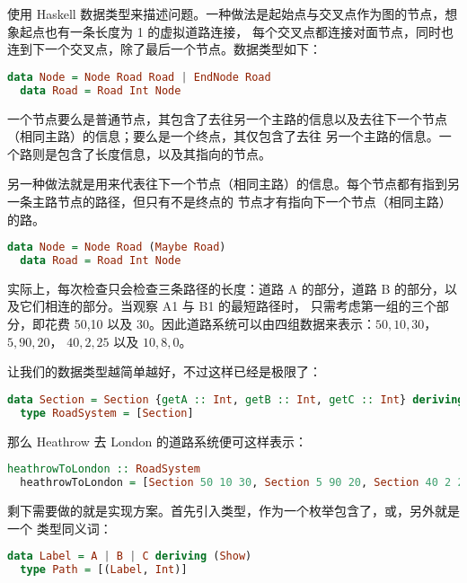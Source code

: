 \documentclass[./main.tex]{subfiles}
\begin{document}
使用 Haskell 数据类型来描述问题。一种做法是起始点与交叉点作为图的节点，想象起点也有一条长度为 1 的虚拟道路连接，
每个交叉点都连接对面节点，同时也连到下一个交叉点，除了最后一个节点。数据类型如下：

\begin{lstlisting}[language=Haskell]
  data Node = Node Road Road | EndNode Road
  data Road = Road Int Node
\end{lstlisting}

一个节点要么是普通节点，其包含了去往另一个主路的信息以及去往下一个节点（相同主路）的信息；要么是一个终点，其仅包含了去往
另一个主路的信息。一个路则是包含了长度信息，以及其指向的节点。

另一种做法就是用来代表往下一个节点（相同主路）的信息。每个节点都有指到另一条主路节点的路径，但只有不是终点的
节点才有指向下一个节点（相同主路）的路。

\begin{lstlisting}[language=Haskell]
  data Node = Node Road (Maybe Road)
  data Road = Road Int Node
\end{lstlisting}

实际上，每次检查只会检查三条路径的长度：道路 A 的部分，道路 B 的部分，以及它们相连的部分。当观察 A1 与 B1 的最短路径时，
只需考虑第一组的三个部分，即花费 50,10 以及 30。因此道路系统可以由四组数据来表示：$50, 10, 30$，$5, 90, 20$，
$40, 2, 25$ 以及 $10, 8, 0$。

让我们的数据类型越简单越好，不过这样已经是极限了：

\begin{lstlisting}[language=Haskell]
  data Section = Section {getA :: Int, getB :: Int, getC :: Int} deriving (Show)
  type RoadSystem = [Section]
\end{lstlisting}

那么 Heathrow 去 London 的道路系统便可这样表示：

\begin{lstlisting}[language=Haskell]
  heathrowToLondon :: RoadSystem
  heathrowToLondon = [Section 50 10 30, Section 5 90 20, Section 40 2 25, Section 10 8 0]
\end{lstlisting}

剩下需要做的就是实现方案。首先引入类型，作为一个枚举包含了，或，另外就是一个
类型同义词：

\begin{lstlisting}[language=Haskell]
  data Label = A | B | C deriving (Show)
  type Path = [(Label, Int)]
\end{lstlisting}
\end{document}
